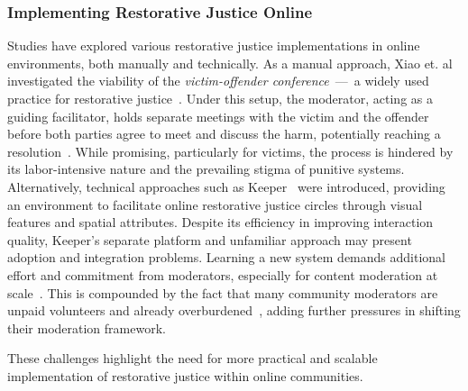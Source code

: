 \subsubsection{Implementing Restorative Justice Online}
Studies have explored various restorative justice implementations in online environments, both manually and technically. As a manual approach, Xiao et. al investigated the viability of the \textit{victim-offender conference}~---~a widely used practice for restorative justice~\cite{Xiao2023}. Under this setup, the moderator, acting as a guiding facilitator, holds separate meetings with the victim and the offender before both parties agree to meet and discuss the harm, potentially reaching a resolution~\cite{Zehr2015}. While promising, particularly for victims, the process is hindered by its labor-intensive nature and the prevailing stigma of punitive systems. Alternatively, technical approaches such as Keeper~\cite{Hughes2020} were introduced, providing an environment to facilitate online restorative justice circles through visual features and spatial attributes. Despite its efficiency in improving interaction quality, Keeper’s separate platform and unfamiliar approach may present adoption and integration problems. Learning a new system demands additional effort and commitment from moderators, especially for content moderation at scale~\cite{Kiene2019}. This is compounded by the fact that many community moderators are unpaid volunteers and already overburdened~\cite{Wohn2019}, adding further pressures in shifting their moderation framework.

These challenges highlight the need for more practical and scalable implementation of restorative justice within online communities.


